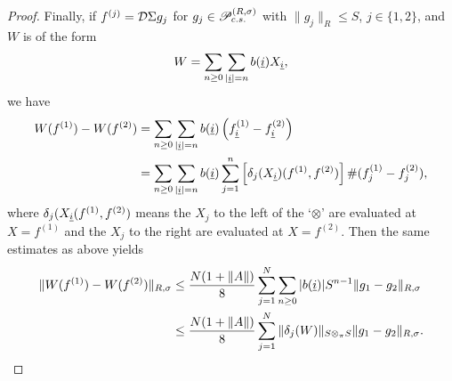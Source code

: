 \begin{proof}
Finally, if $f^{(j)}=\D\Sigma g_j$ for $g_j\in \P_{c.s.}^{(R,\sigma)}$ with $\|g_j\|_R\leq S$, $j\in\{1,2\}$, and $W$ is of the form
	\begin{align*}
		W=\sum_{n\geq 0} \sum_{|\ul{i}|=n} b(\ul{i}) X_{\ul{i}},
	\end{align*}
we have
	\begin{align*}
		W(f^{(1)})-W(f^{(2)}) &= \sum_{n\geq 0}\sum_{|\ul{i}|=n} b(\ul{i}) \left( f^{(1)}_{\ul{i}} - f^{(2)}_{\ul{i}}\right)\\
			&= \sum_{n\geq 0}\sum_{|\ul{i}|=n} b(\ul{i}) \sum_{j=1}^n \left[\delta_j(X_{\ul{i}})(f^{(1)},f^{(2)})\right]\# (f^{(1)}_j - f^{(2)}_j),
	\end{align*}
where $\delta_j(X_{\ul{i}}(f^{(1)},f^{(2)})$ means the $X_j$ to the left of the `$\otimes$' are evaluated at $X=f^{(1)}$ and the $X_j$ to the right are evaluated at $X=f^{(2)}$. Then the same estimates as above yields
	\begin{align*}
		\| W(f^{(1)}) - W(f^{(2)}) \|_{R,\sigma} &\leq \frac{N(1+\|A\|)}{8}\sum_{j=1}^N \sum_{n\geq 0} |b(\ul{i})| S^{n-1} \| g_1 - g_2\|_{R,\sigma}\\
			&\leq \frac{N(1+\|A\|)}{8}\sum_{j=1}^N \|\delta_j(W)\|_{S\otimes_\pi S} \|g_1 - g_2\|_{R,\sigma}.
	\end{align*}
\end{proof}



